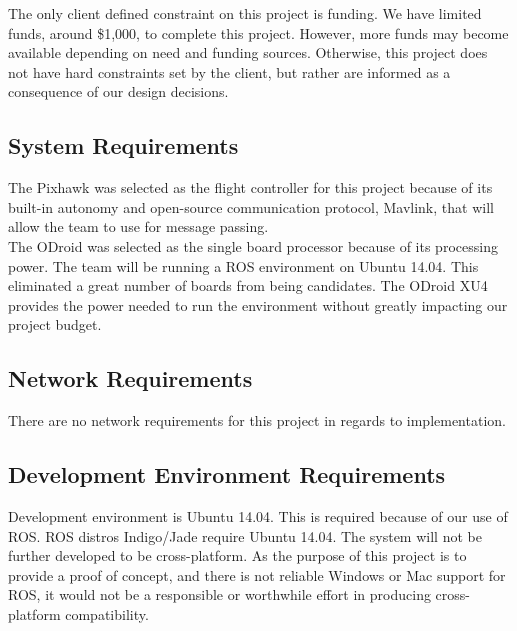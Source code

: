 The only client defined constraint on this project is funding. We have limited funds, around \$1,000, to complete this project. However, more funds may become available depending on need and funding sources. Otherwise, this project does not have hard constraints set by the client, but rather are informed as a consequence of our design decisions.\\

\subsection{System  Requirements}
The Pixhawk was selected as the flight controller for this project because of its built-in autonomy and open-source communication protocol, Mavlink, that will allow the team to use for message passing. \\

The ODroid was selected as the single board processor because of its processing power. The team will be running a ROS environment on Ubuntu 14.04. This eliminated a great number of boards from being candidates. The ODroid XU4 provides the power needed to run the environment without greatly impacting our project budget.\\ 

\subsection{Network Requirements}
There are no network requirements for this project in regards to implementation.\\

\subsection{Development Environment Requirements}
Development environment is Ubuntu 14.04. This is required because of our use of ROS. ROS distros Indigo/Jade require Ubuntu 14.04. The system will not be further developed to be cross-platform. As the purpose of this project is to provide a proof of concept, and there is not reliable Windows or Mac support for ROS, it would not be a responsible or worthwhile effort in producing cross-platform compatibility.\\

